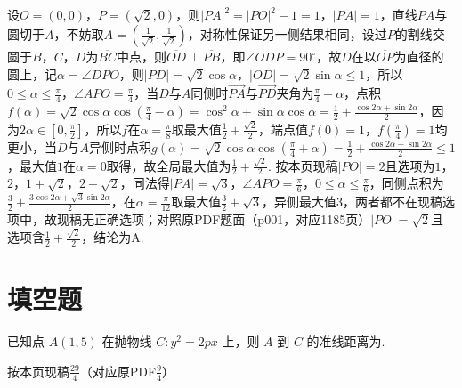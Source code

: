 \begin{solution}
设\(O=\left(0,0\right)\)，\(P=\left(\sqrt{2},0\right)\)，则\(\left\lvert PA\right\rvert^{2}=\left\lvert PO\right\rvert^{2}-1=1\)，\(\left\lvert PA\right\rvert=1\)，直线\(PA\)与圆切于\(A\)，不妨取\(A=\left(\frac{1}{\sqrt{2}},\frac{1}{\sqrt{2}}\right)\)，对称性保证另一侧结果相同，设过\(P\)的割线交圆于\(B\)，\(C\)，\(D\)为\(\overline{BC}\)中点，则\(\overline{OD}\perp\overline{PB}\)，即\(\angle ODP=90^\circ\)，故\(D\)在以\(\overline{OP}\)为直径的圆上，记\(\alpha=\angle DPO\)，则\(\left\lvert PD\right\rvert=\sqrt{2}\cos\alpha\)，\(\left\lvert OD\right\rvert=\sqrt{2}\sin\alpha\le1\)，所以\(0\le\alpha\le\frac{\pi}{4}\)，\(\angle APO=\frac{\pi}{4}\)，当\(D\)与\(A\)同侧时\(\overrightarrow{PA}\)与\(\overrightarrow{PD}\)夹角为\(\frac{\pi}{4}-\alpha\)，点积\(f\left(\alpha\right)=\sqrt{2}\cos\alpha\cos\left(\frac{\pi}{4}-\alpha\right)=\cos^{2}\alpha+\sin\alpha\cos\alpha=\frac{1}{2}+\frac{\cos2\alpha+\sin2\alpha}{2}\)，因为\(2\alpha\in\left[0,\frac{\pi}{2}\right]\)，所以\(f\)在\(\alpha=\frac{\pi}{8}\)取最大值\(\frac{1}{2}+\frac{\sqrt{2}}{2}\)，端点值\(f\left(0\right)=1\)，\(f\left(\frac{\pi}{4}\right)=1\)均更小，当\(D\)与\(A\)异侧时点积\(g\left(\alpha\right)=\sqrt{2}\cos\alpha\cos\left(\frac{\pi}{4}+\alpha\right)=\frac{1}{2}+\frac{\cos2\alpha-\sin2\alpha}{2}\le1\)，最大值\(1\)在\(\alpha=0\)取得，故全局最大值为\(\frac{1}{2}+\frac{\sqrt{2}}{2}\). 按本页现稿\(\left\lvert PO\right\rvert=2\)且选项为\(1\)，\(2\)，\(1+\sqrt{2}\)，\(2+\sqrt{2}\)，同法得\(\left\lvert PA\right\rvert=\sqrt{3}\)，\(\angle APO=\frac{\pi}{6}\)，\(0\le\alpha\le\frac{\pi}{6}\)，同侧点积为\(\frac{3}{2}+\frac{3\cos2\alpha+\sqrt{3}\sin2\alpha}{2}\)，在\(\alpha=\frac{\pi}{12}\)取最大值\(\frac{3}{2}+\sqrt{3}\)，异侧最大值\(3\)，两者都不在现稿选项中，故现稿无正确选项；对照原PDF题面（p001，对应1185页）\(\left\lvert PO\right\rvert=\sqrt{2}\)且选项含\(\frac{1}{2}+\frac{\sqrt{2}}{2}\)，结论为A.
\end{solution}
\section{填空题}

\begin{problem}
已知点 \(A(1,5)\) 在抛物线 \(C:y^2=2px\) 上，则 \(A\) 到 \(C\) 的准线距离为\fillinblank{}.
\end{problem}

\begin{answer}
按本页现稿\(\frac{29}{4}\)（对应原PDF\(\frac{9}{4}\)）
\end{answer}

